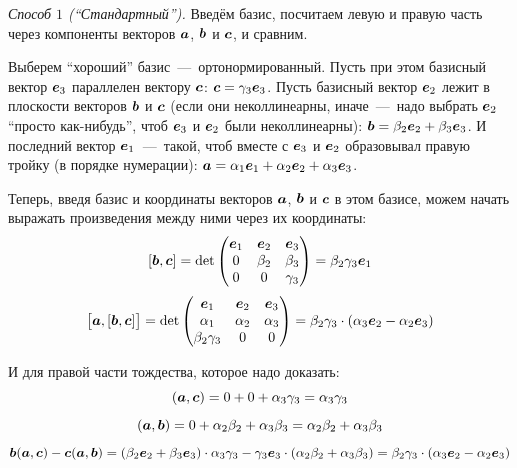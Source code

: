 \documentclass[a4paper,12pt]{article}
\begin{document}
  \begin{solution}
    \leavevmode
    
    \emph{Способ $1$ (``Стандартный'').}
    Введём базис, посчитаем левую и правую часть через компоненты векторов $\boldsymbol a$, $\boldsymbol b$ и $\boldsymbol c$, и сравним.
    
    Выберем ``хороший'' базис~---~ортонормированный.
    Пусть при этом базисный вектор $\boldsymbol e_3$ параллелен вектору $\boldsymbol c$: $\bds c \hm= \gamma_3 \bds e_3$.
    Пусть базисный вектор $\boldsymbol e_2$ лежит в плоскости векторов $\boldsymbol b$ и $\boldsymbol c$ (если они неколлинеарны, иначе~---~надо выбрать $\boldsymbol e_2$ ``просто как-нибудь'', чтоб $\boldsymbol e_3$ и $\boldsymbol e_2$ были неколлинеарны): $\bds b \hm= \beta_2 \bds e_2 \hm+ \beta_3 \bds e_3$.
    И последний вектор $\boldsymbol e_1$~---~такой, чтоб вместе с $\boldsymbol e_3$ и $\boldsymbol e_2$ образовывал правую тройку (в порядке нумерации): $\bds a \hm= \alpha_1 \bds e_1 \hm+ \alpha_2 \bds e_2 \hm+ \alpha_3 \bds e_3$.
    
    Теперь, введя базис и координаты векторов $\boldsymbol a$, $\boldsymbol b$ и $\boldsymbol c$ в этом базисе, можем начать выражать произведения между ними через их координаты:
    \[
      [\boldsymbol b, \boldsymbol c] = \det \begin{pmatrix}
        \boldsymbol e_1 & \boldsymbol e_2 & \boldsymbol e_3\\
        0        & \beta_2  & \beta_3\\
        0        & 0        & \gamma_3
      \end{pmatrix}
      = \beta_2 \gamma_3 \boldsymbol e_1
    \]
    \[
      \bigl[\boldsymbol a, [\boldsymbol b, \boldsymbol c]\bigr] = \det \begin{pmatrix}
        \boldsymbol e_1         & \boldsymbol e_2 & \boldsymbol e_3\\
        \alpha_1         & \alpha_2 & \alpha_3\\
        \beta_2 \gamma_3 & 0        & 0
      \end{pmatrix}
      = \beta_2 \gamma_3 \cdot (\alpha_3 \boldsymbol e_2 - \alpha_2 \boldsymbol e_3)
    \]
    
    И для правой части тождества, которое надо доказать:
    \[
      (\boldsymbol a, \boldsymbol c) = 0 + 0 + \alpha_3 \gamma_3 = \alpha_3 \gamma_3
    \]
    \[
      (\boldsymbol a, \boldsymbol b) = 0 + \alpha_2 \beta_2 + \alpha_3 \beta_3 = \alpha_2 \beta_2 + \alpha_3 \beta_3
    \]
    \[
      \boldsymbol b (\boldsymbol a, \boldsymbol c) - \boldsymbol c (\boldsymbol a, \boldsymbol b)
        = (\beta_2 \boldsymbol e_2 + \beta_3 \boldsymbol e_3) \cdot \alpha_3 \gamma_3 - \gamma_3 \boldsymbol e_3 \cdot (\alpha_2 \beta_2 + \alpha_3 \beta_3)
        = \beta_2 \gamma_3 \cdot (\alpha_3 \boldsymbol e_2 - \alpha_2 \boldsymbol e_3)
    \]
    

\end{solution}
\end{document}
